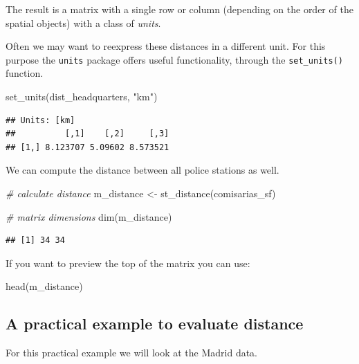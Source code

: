 \documentclass[
]{book}
\newenvironment{Shaded}{\begin{snugshade}}{\end{snugshade}}
\newcommand{\CommentTok}[1]{\textcolor[rgb]{0.56,0.35,0.01}{\textit{#1}}}
\newcommand{\FunctionTok}[1]{\textcolor[rgb]{0.00,0.00,0.00}{#1}}
\newcommand{\NormalTok}[1]{#1}
\newcommand{\OtherTok}[1]{\textcolor[rgb]{0.56,0.35,0.01}{#1}}
\newcommand{\StringTok}[1]{\textcolor[rgb]{0.31,0.60,0.02}{#1}}
\begin{document}
The result is a matrix with a single row or column (depending on the order of the spatial objects) with a class of \emph{units}.

Often we may want to reexpress these distances in a different unit. For this purpose the \texttt{units} package offers useful functionality, through the \texttt{set\_units()} function.

\begin{Shaded}
\begin{Highlighting}[]
\FunctionTok{set\_units}\NormalTok{(dist\_headquarters, }\StringTok{"km"}\NormalTok{)}
\end{Highlighting}
\end{Shaded}

\begin{verbatim}
## Units: [km]
##          [,1]    [,2]     [,3]
## [1,] 8.123707 5.09602 8.573521
\end{verbatim}

We can compute the distance between all police stations as well.

\begin{Shaded}
\begin{Highlighting}[]
\CommentTok{\# calculate distance}
\NormalTok{m\_distance }\OtherTok{\textless{}{-}} \FunctionTok{st\_distance}\NormalTok{(comisarias\_sf)}

\CommentTok{\# matrix dimensions}
\FunctionTok{dim}\NormalTok{(m\_distance)}
\end{Highlighting}
\end{Shaded}

\begin{verbatim}
## [1] 34 34
\end{verbatim}

If you want to preview the top of the matrix you can use:

\begin{Shaded}
\begin{Highlighting}[]
\FunctionTok{head}\NormalTok{(m\_distance)}
\end{Highlighting}
\end{Shaded}

\hypertarget{a-practical-example-to-evaluate-distance}{%
\subsection{A practical example to evaluate distance}\label{a-practical-example-to-evaluate-distance}}

For this practical example we will look at the Madrid data.
\end{document}
